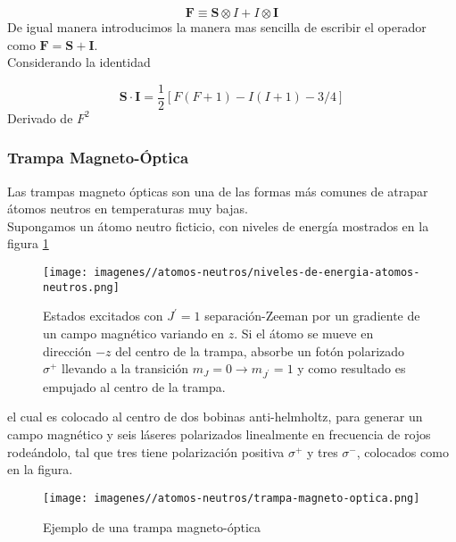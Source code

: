 \begin{equation}
    \mathbf{F}\equiv\mathbf{S}\otimes I+I\otimes\mathbf{I}
\end{equation}
De igual manera introducimos la manera mas sencilla de escribir el operador como $\mathbf{F}=\mathbf{S}+\mathbf{I}$.\\
Considerando la identidad

\begin{equation}
    \mathbf{S}\cdot\mathbf{I}=\frac{1}{2}\left[F(F+1)-I(I+1)-3/4\right]
\end{equation}
Derivado de $F^{2}$ 

\subsubsection{Trampa Magneto-Óptica}

Las trampas magneto ópticas son una de las formas más comunes de atrapar átomos neutros en temperaturas muy bajas.\\
Supongamos un átomo neutro ficticio, con niveles de energía mostrados en la figura \ref{fig:niveles-de-energia-atomo-neutro}

\begin{figure}
    \centering
    \texttt{[image: imagenes//atomos-neutros/niveles-de-energia-atomos-neutros.png]}
    \caption{Estados excitados con $J^{\prime}=1$ separación-Zeeman por un gradiente de un campo magnético variando en $z$. Si el átomo se mueve en dirección $-z$ del centro de la trampa, absorbe un fotón polarizado $\sigma^{+}$ llevando a la transición $m_{J}=0\rightarrow m_{J^{\prime}}=1$ y como resultado es empujado al centro de la trampa.}
    \label{fig:niveles-de-energia-atomo-neutro}
\end{figure}

el cual es colocado al centro de dos bobinas anti-helmholtz, para generar un campo magnético y seis láseres polarizados linealmente en frecuencia de rojos rodeándolo, tal que tres tiene polarización positiva $\sigma^{+}$ y tres $\sigma^{-}$, colocados como en la figura. 

\begin{figure}
    \centering
    \texttt{[image: imagenes//atomos-neutros/trampa-magneto-optica.png]}
    \caption{Ejemplo de una trampa magneto-óptica}
    \label{fig:enter-label}
\end{figure}

